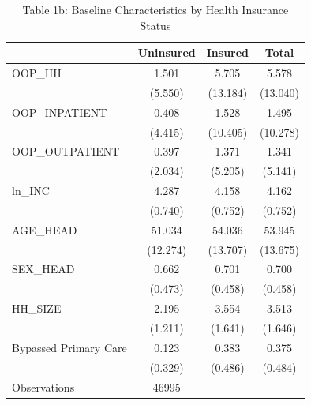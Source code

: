 \begin{table}[htbp]\centering
\caption{Table 1b: Baseline Characteristics by Health Insurance Status}
\begin{tabular}{l*{3}{c}}
\hline\hline
                    &   Uninsured&     Insured&       Total\\
\hline
OOP\_HH              &       1.501&       5.705&       5.578\\
                    &     (5.550)&    (13.184)&    (13.040)\\
[1em]
OOP\_INPATIENT       &       0.408&       1.528&       1.495\\
                    &     (4.415)&    (10.405)&    (10.278)\\
[1em]
OOP\_OUTPATIENT      &       0.397&       1.371&       1.341\\
                    &     (2.034)&     (5.205)&     (5.141)\\
[1em]
ln\_INC              &       4.287&       4.158&       4.162\\
                    &     (0.740)&     (0.752)&     (0.752)\\
[1em]
AGE\_HEAD            &      51.034&      54.036&      53.945\\
                    &    (12.274)&    (13.707)&    (13.675)\\
[1em]
SEX\_HEAD            &       0.662&       0.701&       0.700\\
                    &     (0.473)&     (0.458)&     (0.458)\\
[1em]
HH\_SIZE             &       2.195&       3.554&       3.513\\
                    &     (1.211)&     (1.641)&     (1.646)\\
[1em]
Bypassed Primary Care&       0.123&       0.383&       0.375\\
                    &     (0.329)&     (0.486)&     (0.484)\\
\hline
Observations        &       46995&            &            \\
\hline\hline
\end{tabular}
\end{table}
